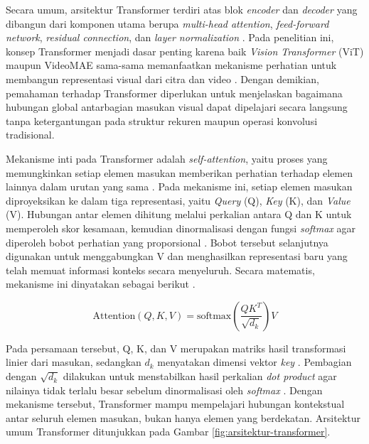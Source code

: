 Secara umum, arsitektur Transformer terdiri atas blok \textit{encoder} dan \textit{decoder} yang dibangun dari komponen utama berupa \textit{multi-head attention}, \textit{feed-forward network}, \textit{residual connection}, dan \textit{layer normalization} \cite{vaswani2023attentionneed}. Pada penelitian ini, konsep Transformer menjadi dasar penting karena baik \textit{Vision Transformer} (ViT) maupun VideoMAE sama-sama memanfaatkan mekanisme perhatian untuk membangun representasi visual dari citra dan video \cite{dosovitskiy2021imageworth16x16words,tong2022videomaemaskedautoencodersdataefficient,vaswani2023attentionneed}. Dengan demikian, pemahaman terhadap Transformer diperlukan untuk menjelaskan bagaimana hubungan global antarbagian masukan visual dapat dipelajari secara langsung tanpa ketergantungan pada struktur rekuren maupun operasi konvolusi tradisional. \par

Mekanisme inti pada Transformer adalah \textit{self-attention}, yaitu proses yang memungkinkan setiap elemen masukan memberikan perhatian terhadap elemen lainnya dalam urutan yang sama \cite{vaswani2023attentionneed}. Pada mekanisme ini, setiap elemen masukan diproyeksikan ke dalam tiga representasi, yaitu \textit{Query} (Q), \textit{Key} (K), dan \textit{Value} (V). Hubungan antar elemen dihitung melalui perkalian antara Q dan K untuk memperoleh skor kesamaan, kemudian dinormalisasi dengan fungsi \textit{softmax} agar diperoleh bobot perhatian yang proporsional \cite{vaswani2023attentionneed}. Bobot tersebut selanjutnya digunakan untuk menggabungkan V dan menghasilkan representasi baru yang telah memuat informasi konteks secara menyeluruh. Secara matematis, mekanisme ini dinyatakan sebagai berikut \cite{vaswani2023attentionneed}.

\vspace{0.6\baselineskip}
\begingroup
\begin{equation}
\mathrm{Attention}(Q, K, V) = \mathrm{softmax}\left(\frac{QK^{T}}{\sqrt{d_k}}\right)V
\label{eq:self-attention}
\end{equation}
\endgroup
\vspace{0.6\baselineskip}

Pada persamaan tersebut, Q, K, dan V merupakan matriks hasil transformasi linier dari masukan, sedangkan $d_k$ menyatakan dimensi vektor \textit{key} \cite{vaswani2023attentionneed}. Pembagian dengan $\sqrt{d_k}$ dilakukan untuk menstabilkan hasil perkalian \textit{dot product} agar nilainya tidak terlalu besar sebelum dinormalisasi oleh \textit{softmax} \cite{vaswani2023attentionneed}. Dengan mekanisme tersebut, Transformer mampu mempelajari hubungan kontekstual antar seluruh elemen masukan, bukan hanya elemen yang berdekatan. Arsitektur umum Transformer ditunjukkan pada Gambar \ref{fig:arsitektur-transformer}. \par


